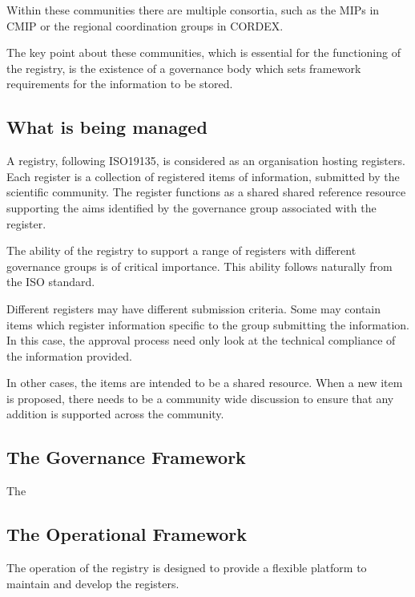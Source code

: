 \documentclass[gmd,dvipsnames]{copernicus}
\begin{document}
Within these communities there are multiple consortia, such as the MIPs in CMIP or the regional coordination groups in CORDEX.

The key point about these communities, which is essential for the functioning of the registry, is the existence of a governance body
which sets framework requirements for the information to be stored. 




\subsection{What is being managed}

A registry, following ISO19135, is considered as an organisation hosting registers. Each register is a collection of registered items of information, 
submitted by the scientific community. The register functions as a shared shared reference resource supporting the aims identified by the governance
group associated with the register.

The ability of the registry to support a range of registers with different governance groups is of critical importance. This ability
follows naturally from the ISO standard.

Different registers may have different submission criteria. Some may contain items which register information specific to the group 
submitting the information. In this case, the approval process need only look at the technical compliance of the information provided.

In other cases, the items are intended to be a shared resource. When a new item is proposed, there needs to be a community wide discussion 
to ensure that any addition is supported across the community.


\subsection{The Governance Framework}

The 

\subsection{The Operational Framework}

The operation of the registry is designed to provide a flexible platform to maintain and develop the registers.
\end{document}
